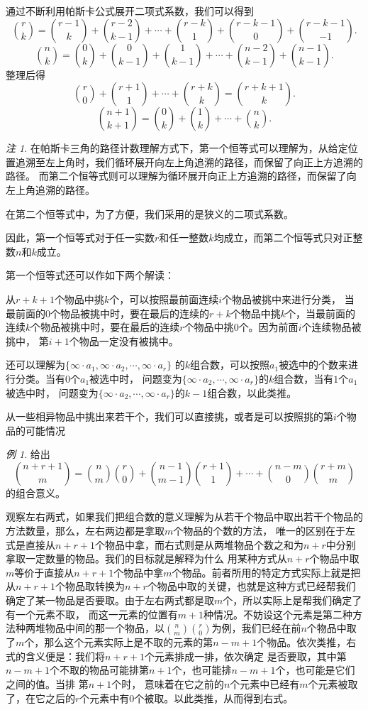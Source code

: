 \documentclass[a4paper,11pt]{article}%
\theoremstyle{remark}
\newtheorem*{remark}{注}
\theoremstyle{remark}
\newtheorem*{example}{例}
\theoremstyle{definition}
\theoremstyle{definition}
\theoremstyle{definition}
\begin{document}
通过不断利用帕斯卡公式展开二项式系数，我们可以得到
\[\binom{r}{k}=\binom{r-1}{k}+\binom{r-2}{k-1}+\cdots+\binom{r-k}{1}+\binom{r-k-1}{0}+\binom{r-k-1}{-1}.\]
\[\binom{n}{k}=\binom{0}{k}+\binom{0}{k-1}+\binom{1}{k-1}+\cdots +\binom{n-2}{k-1}+\binom{n-1}{k-1}.\]
整理后得
\[\binom{r}{0}+\binom{r+1}{1}+\cdots+\binom{r+k}{k}=\binom{r+k+1}{k}.\]
\[\binom{n+1}{k+1}=\binom{0}{k}+\binom{1}{k}+\cdots+\binom{n}{k}.\]
\begin{remark}
   在帕斯卡三角的路径计数理解方式下，第一个恒等式可以理解为，从给定位置追溯至左上角时，我们循环展开向左上角追溯的路径，而保留了向正上方追溯的路径。 
   而第二个恒等式则可以理解为循环展开向正上方追溯的路径，而保留了向左上角追溯的路径。

   在第二个恒等式中，为了方便，我们采用的是狭义的二项式系数。

   因此，第一个恒等式对于任一实数$r$和任一整数$k$均成立，而第二个恒等式只对正整数$n$和$k$成立。

   第一个恒等式还可以作如下两个解读：

   从$r+k+1$个物品中挑$k$个，可以按照最前面连续$i$个物品被挑中来进行分类，
   当最前面的$0$个物品被挑中时，要在最后的连续的$r+k$个物品中挑$k$个，当最前面的
   连续$k$个物品被挑中时，要在最后的连续$r$个物品中挑$0$个。因为前面$i$个连续物品被挑中，
   第$i+1$个物品一定没有被挑中。

   还可以理解为$\{\infty\cdot a_1,\infty\cdot a_2,\cdots,\infty\cdot a_{r}\}$
   的$k$组合数，可以按照$a_1$被选中的个数来进行分类。当有$0$个$a_1$被选中时，
   问题变为$\{\infty\cdot a_2,\cdots,\infty\cdot a_{r}\}$的$k$组合数，当有$1$个$a_1$被选中时，
    问题变为$\{\infty\cdot a_2,\cdots,\infty\cdot a_{r}\}$的$k-1$组合数，以此类推。
\end{remark}
从一些相异物品中挑出来若干个，我们可以直接挑，或者是可以按照挑的第$i$个物品的可能情况
\begin{example}
    给出
    \[\binom{n+r+1}{m}=\binom{n}{m}\binom{r}{0}+\binom{n-1}{m-1}\binom{r+1}{1}+\cdots+\binom{n-m}{0}\binom{r+m}{m}\]
    的组合意义。

    观察左右两式，如果我们把组合数的意义理解为从若干个物品中取出若干个物品的方法数量，那么，左右两边都是拿取$m$个物品的个数的方法，
    唯一的区别在于左式是直接从$n+r+1$个物品中拿，而右式则是从两堆物品个数之和为$n+r$中分别拿取一定数量的物品。我们的目标就是解释为什么
    用某种方式从$n+r$个物品中取$m$等价于直接从$n+r+1$个物品中拿$m$个物品。前者所用的特定方式实际上就是把从$n+r+1$个物品取转换为$n+r$个物品中取的关键，也就是这种方式已经帮我们确定了某一物品是否要取。由于左右两式都是取$m$个，所以实际上是帮我们确定了有一个元素不取，
    而这一元素的位置有$m+1$种情况。不妨设这个元素是第二种方法种两堆物品中间的那一个物品，以$\binom{n}{m}\binom{r}{0}$为例，我们已经在前$n$个物品中取了$m$个，那么这个元素实际上是不取的元素的第$n-m+1$个物品。依次类推，右式的含义便是：我们将$n+r+1$个元素排成一排，依次确定
    是否要取，其中第$n-m+1$个不取的物品可能排第$n+1$个，也可能排$n-m+1$个，也可能是它们之间的值。当排 第$n+1$个时， 
    意味着在它之前的$n$个元素中已经有$m$个元素被取了，在它之后的$r$个元素中有$0$个被取。以此类推，从而得到右式。

\end{example}
\end{document}
